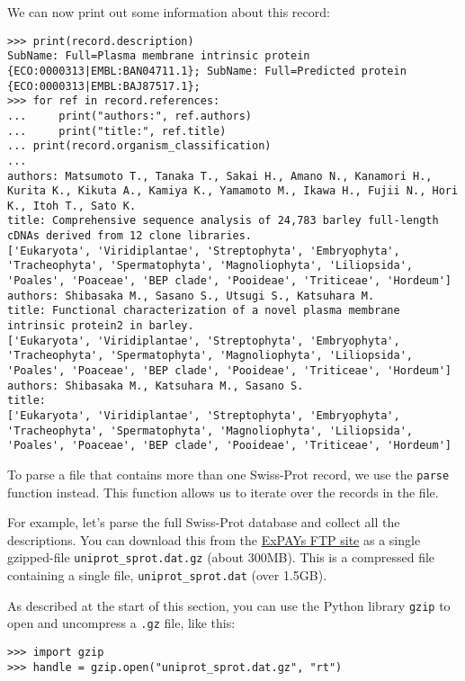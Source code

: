 We can now print out some information about this record:
\begin{verbatim}
>>> print(record.description)
SubName: Full=Plasma membrane intrinsic protein {ECO:0000313|EMBL:BAN04711.1}; SubName: Full=Predicted protein {ECO:0000313|EMBL:BAJ87517.1};
>>> for ref in record.references:
...     print("authors:", ref.authors)
...     print("title:", ref.title)
...	print(record.organism_classification)
...
authors: Matsumoto T., Tanaka T., Sakai H., Amano N., Kanamori H., Kurita K., Kikuta A., Kamiya K., Yamamoto M., Ikawa H., Fujii N., Hori K., Itoh T., Sato K.
title: Comprehensive sequence analysis of 24,783 barley full-length cDNAs derived from 12 clone libraries.
['Eukaryota', 'Viridiplantae', 'Streptophyta', 'Embryophyta', 'Tracheophyta', 'Spermatophyta', 'Magnoliophyta', 'Liliopsida', 'Poales', 'Poaceae', 'BEP clade', 'Pooideae', 'Triticeae', 'Hordeum']
authors: Shibasaka M., Sasano S., Utsugi S., Katsuhara M.
title: Functional characterization of a novel plasma membrane intrinsic protein2 in barley.
['Eukaryota', 'Viridiplantae', 'Streptophyta', 'Embryophyta', 'Tracheophyta', 'Spermatophyta', 'Magnoliophyta', 'Liliopsida', 'Poales', 'Poaceae', 'BEP clade', 'Pooideae', 'Triticeae', 'Hordeum']
authors: Shibasaka M., Katsuhara M., Sasano S.
title: 
['Eukaryota', 'Viridiplantae', 'Streptophyta', 'Embryophyta', 'Tracheophyta', 'Spermatophyta', 'Magnoliophyta', 'Liliopsida', 'Poales', 'Poaceae', 'BEP clade', 'Pooideae', 'Triticeae', 'Hordeum']
\end{verbatim}

To parse a file that contains more than one Swiss-Prot record, we use the \verb|parse| function instead. This function allows us to iterate over the records in the file.

For example, let's parse the full Swiss-Prot database and collect all the descriptions.
You can download this from the \href{ftp://ftp.expasy.org/databases/uniprot/current_release/knowledgebase/complete/uniprot_sprot.dat.gz}{ExPAYs FTP site} as a single gzipped-file \verb|uniprot_sprot.dat.gz| (about 300MB).  This is a compressed file containing a single file, \verb|uniprot_sprot.dat| (over 1.5GB).

As described at the start of this section, you can use the Python library \verb|gzip| to open and uncompress a \texttt{.gz} file, like this:

\begin{verbatim}
>>> import gzip
>>> handle = gzip.open("uniprot_sprot.dat.gz", "rt")
\end{verbatim}

